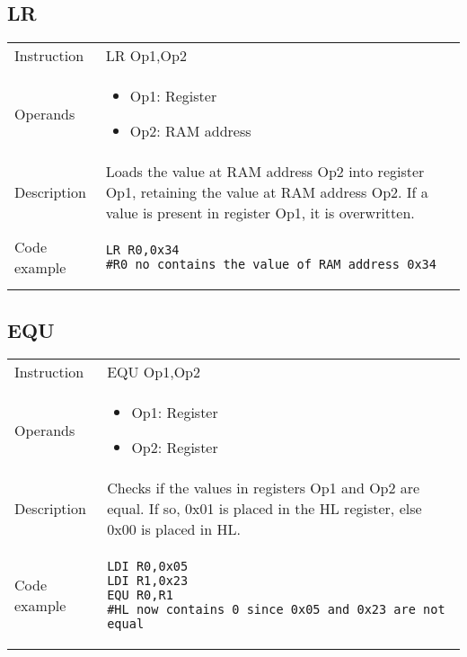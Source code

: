 \newpage

\subsection{LR}
\renewcommand*{\arraystretch}{2.0}
\begin{longtable}{P{3cm}P{9cm}}
\midrule
\noindent Instruction & LR Op1,Op2 \\
\noindent Operands &
\begin{itemize}[label={},noitemsep,leftmargin=*,topsep=0pt,partopsep=0pt, itemsep=1em]
\item Op1: Register
\item Op2: RAM address
\end{itemize}\\
\noindent Description & Loads the value at RAM address Op2 into register Op1, retaining the value at RAM address Op2. If a value is present in register Op1, it is overwritten.
	 \\
\noindent Code example & 
\begin{lstlisting}
LR R0,0x34
#R0 no contains the value of RAM address 0x34
\end{lstlisting} \\
\end{longtable}


\subsection{EQU}
\renewcommand*{\arraystretch}{2.0}
\begin{longtable}{P{3cm}P{9cm}}
\midrule
\noindent Instruction & EQU Op1,Op2 \\
\noindent Operands &
\begin{itemize}[label={},noitemsep,leftmargin=*,topsep=0pt,partopsep=0pt, itemsep=1em]
\item Op1: Register
\item Op2: Register
\end{itemize}\\
\noindent Description & Checks if the values in registers Op1 and Op2 are equal. If so, 0x01 is placed in the HL register, else 0x00 is placed in HL.
	 \\
\noindent Code example & 
\begin{lstlisting}
LDI R0,0x05
LDI R1,0x23
EQU R0,R1
#HL now contains 0 since 0x05 and 0x23 are not equal
\end{lstlisting} \\
\end{longtable}

